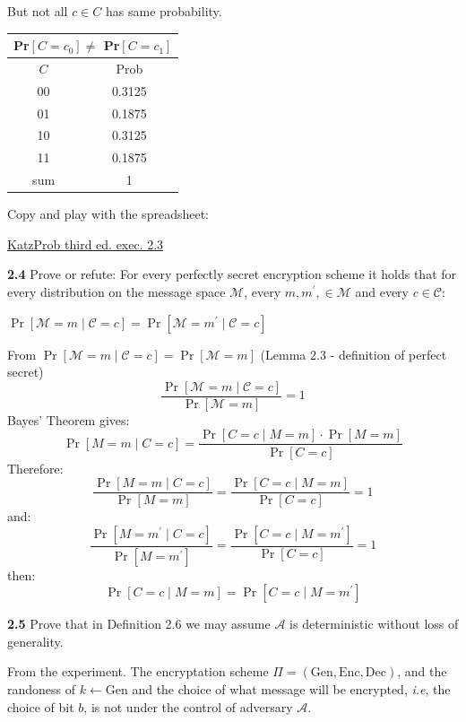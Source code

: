 \vspace{1em}
But not all $c \in C$ has same probability.

\begin{tabular}{|c|c|}
	\hline
	\multicolumn{2}{|c|}{Pr$[C = c_0] \neq$ Pr$[C = c_1]$} \\
	\hline
	$C$ & Prob \\
	\hline
	00 & 0.3125 \\
	01 & 0.1875 \\
	10 & 0.3125 \\
	11 & 0.1875 \\
	\hline
	sum & 1 \\
	\hline
\end{tabular}

\vspace{1em}

Copy and play with the spreadsheet:

\href{https://docs.google.com/spreadsheets/d/1qLP6iL_UqS_zug2SqOV1BsSl5UjEBATFUr7Q9GxjIYQ/edit?usp=sharing}{KatzProb third ed. exec. 2.3}

\newpage
\noindent
\textbf{2.4} \hspace{1em} Prove or refute: For every perfectly secret encryption scheme it holds that for every distribution on the message space $\mathcal{M}$, every $m, m^\prime, \in \mathcal{M}$ and every $c \in \mathcal{C}$:

$\Pr[\mathcal{M}= m \mid \mathcal{C}= c] = \Pr[\mathcal{M}= m^\prime \mid \mathcal{C}= c]$
\vspace{1em}

From $\Pr[\mathcal{M}= m \mid \mathcal{C}= c] = \Pr[\mathcal{M}= m]$ (Lemma 2.3 - definition of perfect secret)
\[
\frac{\Pr[\mathcal{M}= m \mid \mathcal{C}= c]}{\Pr[\mathcal{M}= m]} = 1
\]
Bayes’ Theorem gives:
\[
\Pr[M = m \mid C = c] = \frac{\Pr[C = c \mid M = m] \cdot \Pr[M = m]}{\Pr[C = c]}
\]
Therefore:
\[
\frac{\Pr[M = m \mid C = c]}{\Pr[M = m]} = \frac{\Pr[C = c \mid M = m]}{\Pr[C = c]} = 1
\]
and:
\[
\frac{\Pr[M = m^\prime \mid C = c]}{\Pr[M = m^\prime]} = \frac{\Pr[C = c \mid M = m^\prime]}{\Pr[C = c]} = 1
\]
then:
\[
\Pr[C = c \mid M = m] = \Pr[C = c \mid M = m^\prime]
\]

\newpage
\noindent
\textbf{2.5} \hspace{1em}Prove that in Definition 2.6 we may assume $\mathcal{A}$ is deterministic without loss of generality.
\vspace{1em}

From the experiment. The encryptation scheme $\Pi = (\text{Gen}, \text{Enc}, \text{Dec})$, and the randoness of $k \leftarrow \text{Gen}$ and the choice of what message will be encrypted, \textit{i.e}, the choice of bit $b$, is not under the control of adversary $\mathcal{A}$.

